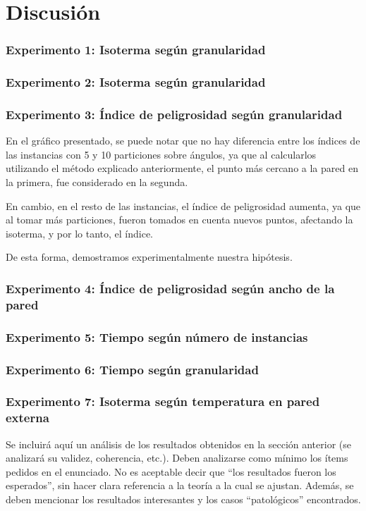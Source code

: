 \section{Discusión}

  	\subsubsection*{Experimento 1: Isoterma según granularidad}

  	\subsubsection*{Experimento 2: Isoterma según granularidad}

  	\subsubsection*{Experimento 3: Índice de peligrosidad según granularidad}
  		En el gráfico presentado, se puede notar que no hay diferencia entre los índices de las instancias con 5 y 10 particiones sobre ángulos, ya que al calcularlos utilizando el método explicado anteriormente, el punto más cercano a la pared en la primera, fue considerado en la segunda. 

  		En cambio, en el resto de las instancias, el índice de peligrosidad aumenta, ya que al tomar más particiones, fueron tomados en cuenta nuevos puntos, afectando la isoterma, y por lo tanto, el índice. 
  		
  		De esta forma, demostramos experimentalmente nuestra hipótesis. 

  	\subsubsection*{Experimento 4: Índice de peligrosidad según ancho de la pared}

  	\subsubsection*{Experimento 5: Tiempo según número de instancias}

  	\subsubsection*{Experimento 6: Tiempo según granularidad}

    \subsubsection*{Experimento 7: Isoterma según temperatura en pared externa}



  {\color{Gray} Se incluirá aquí un análisis de los resultados obtenidos en la sección anterior (se analizará su validez, coherencia, etc.). Deben analizarse como mínimo los ítems pedidos en el enunciado. No es aceptable decir que ``los resultados fueron los esperados'', sin hacer clara referencia a la teoría a la cual se ajustan. Además, se deben mencionar los resultados interesantes y los casos ``patológicos'' encontrados.}
